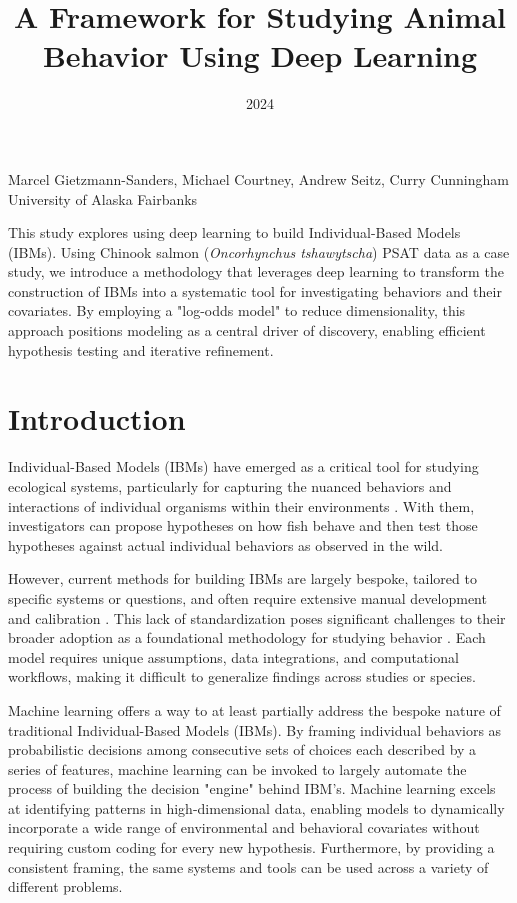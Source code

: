 \documentclass[11pt]{article}
\title{A Framework for Studying Animal Behavior Using Deep Learning}
\date{2024}
\makeatletter
\renewcommand{\maketitle}{
\begin{center}

\pagestyle{empty}

{\LARGE \bf \@title\par}
\vspace{1cm}

{\Large Marcel Gietzmann-Sanders, Michael Courtney, Andrew Seitz, Curry Cunningham}\\[1cm]

University of Alaska Fairbanks


\end{center}
}\makeatother
\makeatother
\begin{document}
\maketitle


\begin{center}
This study explores using deep learning to build Individual-Based Models (IBMs). Using Chinook salmon (\textit{Oncorhynchus tshawytscha}) PSAT data as a case study, we introduce a methodology that leverages deep learning to transform the construction of IBMs into a systematic tool for investigating behaviors and their covariates. By employing a "log-odds model" to reduce dimensionality, this approach positions modeling as a central driver of discovery, enabling efficient hypothesis testing and iterative refinement.
\end{center}



\section*{Introduction}

Individual-Based Models (IBMs) have emerged as a critical tool for studying ecological systems, particularly for capturing the nuanced behaviors and interactions of individual organisms within their environments \citep{grimm}. With them, investigators can propose hypotheses on how fish behave and then test those hypotheses against actual individual behaviors as observed in the wild.

However, current methods for building IBMs are largely bespoke, tailored to specific systems or questions, and often require extensive manual development and calibration \citep{grimm}. This lack of standardization poses significant challenges to their broader adoption as a foundational methodology for studying behavior \citep{grimm}. Each model requires unique assumptions, data integrations, and computational workflows, making it difficult to generalize findings across studies or species. 

Machine learning offers a way to at least partially address the bespoke nature of traditional Individual-Based Models (IBMs). By framing individual behaviors as probabilistic decisions among consecutive sets of choices each described by a series of features, machine learning can be invoked to largely automate the process of building the decision "engine" behind IBM's. Machine learning excels at identifying patterns in high-dimensional data, enabling models to dynamically incorporate a wide range of environmental and behavioral covariates without requiring custom coding for every new hypothesis. Furthermore, by providing a consistent framing, the same systems and tools can be used across a variety of different problems. 
\end{document}
